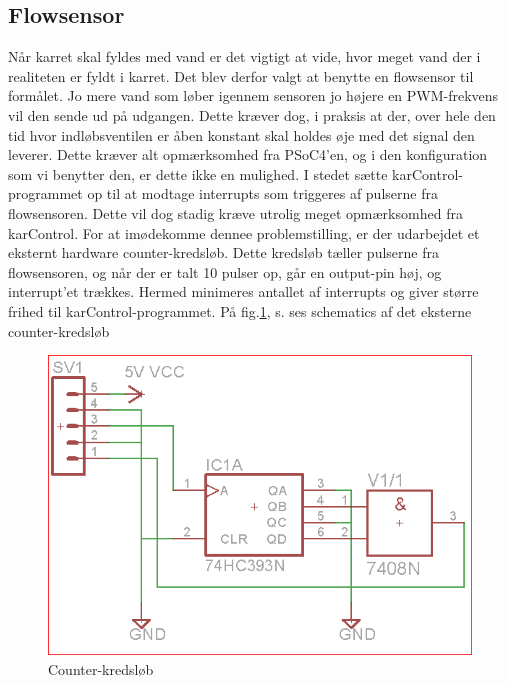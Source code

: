 \subsection{Flowsensor}
Når karret skal fyldes med vand er det vigtigt at vide, hvor meget vand der i realiteten er fyldt i karret. Det blev derfor valgt at benytte en flowsensor til formålet. Jo mere vand som løber igennem sensoren jo højere en PWM-frekvens vil den sende ud på udgangen. Dette kræver dog, i praksis at der, over hele den tid hvor indløbsventilen er åben konstant skal holdes øje med det signal den leverer. Dette kræver alt opmærksomhed fra PSoC4'en, og i den konfiguration som vi benytter den, er dette ikke en mulighed.\newline
I stedet sætte karControl-programmet op til at modtage interrupts som triggeres af pulserne fra flowsensoren. Dette vil dog stadig kræve utrolig meget opmærksomhed fra karControl. For at imødekomme dennee problemstilling, er der udarbejdet et eksternt hardware counter-kredsløb. Dette kredsløb tæller pulserne fra flowsensoren, og når der er talt 10 pulser op, går en output-pin høj, og interrupt'et trækkes. Hermed minimeres antallet af interrupts og giver større frihed til karControl-programmet. På fig.\ref{screenshot:counter}, s.\pageref{screenshot:counter} ses schematics af det eksterne counter-kredsløb

\begin{figure}[H]
	\centering
	\includegraphics[scale=0.45]{Projektbeskrivelse/DesignOgImplementeringAfHW/Screenshots/FlowSensor_Schematics_ver1}
	\caption{Counter-kredsløb}
	\label{screenshot:counter}
\end{figure}


